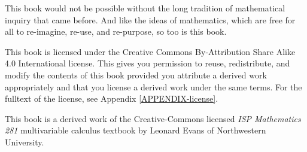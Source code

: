 This book would not be possible without the long tradition
of mathematical inquiry that came before.  And like the 
ideas of mathematics, which are free for all to re-imagine,
re-use, and re-purpose, so too is this book.

This book is licensed under the Creative Commons By-Attribution
Share Alike 4.0 International license.  This gives you permission
to reuse, redistribute, and modify the contents of this book provided
you attribute a derived work appropriately and that you
license a derived work under the same terms.  For the fulltext
of the license, see Appendix \ref{APPENDIX-license}.

This book is a derived work of the Creative-Commons licensed 
\emph{ISP Mathematics 281} multivariable calculus textbook by 
Leonard Evans of Northwestern University.
